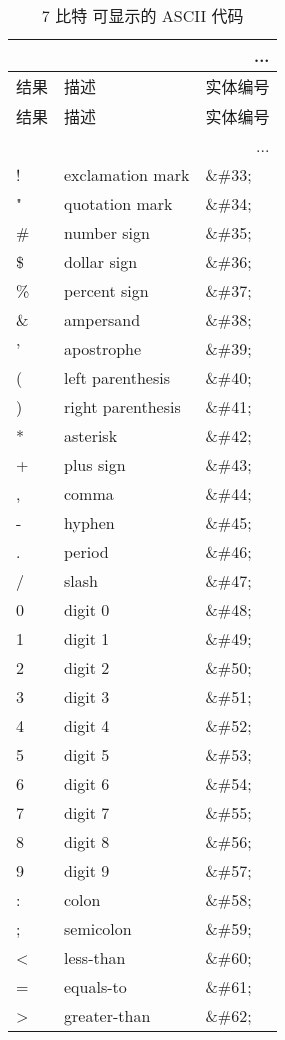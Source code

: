 \begin{longtable}{|l|l|l|}
\multicolumn{3}{r}{...}
\tabularnewline\hline
结果		&描述		&实体编号			
\endhead
\caption{7 比特 可显示的 ASCII 代码}\\
\hline
结果		&描述		&实体编号	
\tabularnewline\hline
\endfirsthead
\multicolumn{3}{r}{...}
\endfoot
\endlastfoot
\hline
		&space			&\&\#32;\\
\hline
!		&exclamation mark	&\&\#33;\\
\hline	
"		&quotation mark	&\&\#34;\\
\hline
\#		&number sign		&\&\#35;\\
\hline
\$		&dollar sign		&\&\#36;\\
\hline
\%		&percent sign		&\&\#37;\\
\hline
\&	&ampersand			&\&\#38;\\
\hline
'	&apostrophe			&\&\#39;\\
\hline
(	&left parenthesis		&\&\#40;\\
\hline
)	&right parenthesis		&\&\#41;\\
\hline
*	&asterisk				&\&\#42;\\
\hline
+	&plus sign			&\&\#43;\\
\hline
,	&comma				&\&\#44;\\
\hline
-	&hyphen				&\&\#45;\\
\hline
.	&period				&\&\#46;\\
\hline
/	&slash				&\&\#47;\\
\hline
0	&digit 0				&\&\#48;\\
\hline
1	&digit 1				&\&\#49;\\
\hline
2	&digit 2				&\&\#50;\\
\hline
3	&digit 3				&\&\#51;\\
\hline
4	&digit 4				&\&\#52;\\
\hline
5	&digit 5				&\&\#53;\\
\hline
6	&digit 6				&\&\#54;\\
\hline
7	&digit 7				&\&\#55;\\
\hline
8	&digit 8				&\&\#56;\\
\hline
9	&digit 9				&\&\#57;\\
\hline
:	&colon				&\&\#58;\\
\hline
;	&semicolon			&\&\#59;\\
\hline
<	&less-than			&\&\#60;\\
\hline
=	&equals-to			&\&\#61;\\
\hline
>	&greater-than			&\&\#62;\\

\end{longtable}
